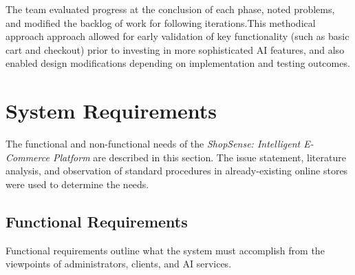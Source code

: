 The team evaluated progress at the conclusion of each phase, noted problems, and modified the backlog of work for following iterations.This methodical approach approach allowed for early validation of key functionality (such as basic cart and checkout) prior to investing in more sophisticated AI features, and also enabled design modifications depending on implementation and testing outcomes.

\section{System Requirements}
The functional and non-functional needs of the \textit{ShopSense: Intelligent E-Commerce Platform} are described in this section. The issue statement, literature analysis, and observation of standard procedures in already-existing online stores were used to determine the needs.


\subsection{Functional Requirements}
Functional requirements outline what the system must accomplish from the viewpoints of administrators, clients, and AI services.

